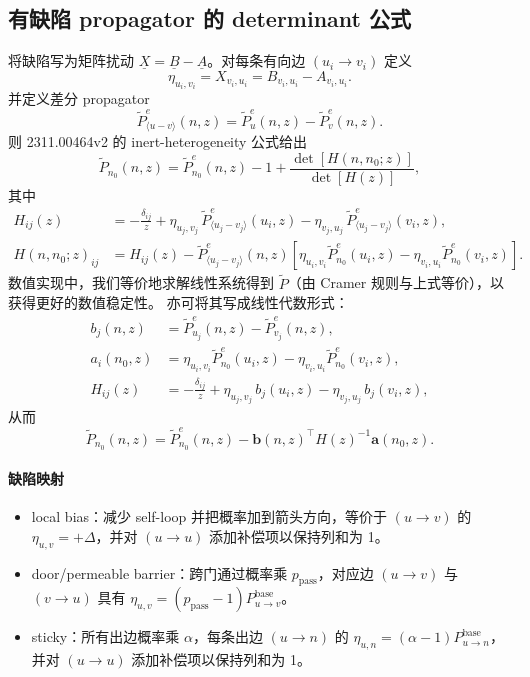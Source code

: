 \documentclass[11pt,fontset=fandol]{ctexart}
\begin{document}
\subsection{有缺陷 propagator 的 determinant 公式}
将缺陷写为矩阵扰动 $\underline{X}=\underline{B}-\underline{A}$。对每条有向边 $(u_i\to v_i)$ 定义
\begin{equation}
  \eta_{u_i,v_i}=X_{v_i,u_i}=B_{v_i,u_i}-A_{v_i,u_i}.
\end{equation}
并定义差分 propagator
\begin{equation}
  \tilde P^e_{\langle u-v\rangle}(n,z)=\tilde P^e_{u}(n,z)-\tilde P^e_{v}(n,z).
\end{equation}
则 2311.00464v2 的 inert-heterogeneity 公式给出
\begin{equation}
  \tilde P_{n_0}(n,z)=\tilde P^e_{n_0}(n,z)-1+\frac{\det[H(n,n_0;z)]}{\det[H(z)]},
\end{equation}
其中
\begin{align}
  H_{ij}(z)&=-\frac{\delta_{ij}}{z}+\eta_{u_j,v_j}\,\tilde P^e_{\langle u_j-v_j\rangle}(u_i,z)-\eta_{v_j,u_j}\,\tilde P^e_{\langle u_j-v_j\rangle}(v_i,z),\\
  H(n,n_0;z)_{ij}&=H_{ij}(z)-\tilde P^e_{\langle u_j-v_j\rangle}(n,z)\left[\eta_{u_i,v_i}\tilde P^e_{n_0}(u_i,z)-\eta_{v_i,u_i}\tilde P^e_{n_0}(v_i,z)\right].
\end{align}
数值实现中，我们等价地求解线性系统得到 $\tilde P$（由 Cramer 规则与上式等价），以获得更好的数值稳定性。
亦可将其写成线性代数形式：
\begin{align}
  b_j(n,z)&=\tilde P^e_{u_j}(n,z)-\tilde P^e_{v_j}(n,z),\\
  a_i(n_0,z)&=\eta_{u_i,v_i}\tilde P^e_{n_0}(u_i,z)-\eta_{v_i,u_i}\tilde P^e_{n_0}(v_i,z),\\
  H_{ij}(z)&=-\frac{\delta_{ij}}{z}+\eta_{u_j,v_j}\,b_j(u_i,z)-\eta_{v_j,u_j}\,b_j(v_i,z),
\end{align}
从而
\begin{equation}
  \tilde P_{n_0}(n,z)=\tilde P^e_{n_0}(n,z)-\mathbf{b}(n,z)^\top H(z)^{-1}\mathbf{a}(n_0,z).
\end{equation}

\paragraph{缺陷映射}
\begin{itemize}
  \item local bias：减少 self-loop 并把概率加到箭头方向，等价于 $(u\to v)$ 的 $\eta_{u,v}=+\Delta$，并对 $(u\to u)$ 添加补偿项以保持列和为 1。
  \item door/permeable barrier：跨门通过概率乘 $p_{\text{pass}}$，对应边 $(u\to v)$ 与 $(v\to u)$ 具有 $\eta_{u,v}=(p_{\text{pass}}-1)P_{u\to v}^{\text{base}}$。
  \item sticky：所有出边概率乘 $\alpha$，每条出边 $(u\to n)$ 的 $\eta_{u,n}=(\alpha-1)P_{u\to n}^{\text{base}}$，并对 $(u\to u)$ 添加补偿项以保持列和为 1。
\end{itemize}
\end{document}
